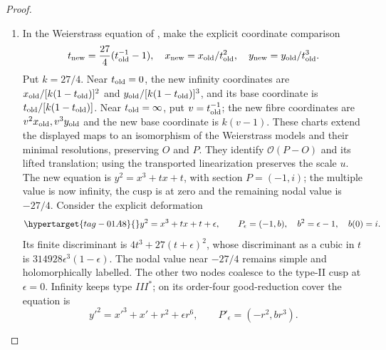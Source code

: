 \begin{proof}

\begin{enumerate}[label=\arabic*.,leftmargin=*]
\item In the Weierstrass equation of \cite[Proposition~2.1]{LiuRollenske2026}, make the explicit
coordinate comparison
\[
 t_{\rm new}=\frac{27}{4}(t_{\rm old}^{-1}-1),\quad
 x_{\rm new}=x_{\rm old}/t_{\rm old}^2,\quad
 y_{\rm new}=y_{\rm old}/t_{\rm old}^3.
\]
Put $k=27/4$. Near $t_{\rm old}=0$, the new infinity coordinates are
$x_{\rm old}/[k(1-t_{\rm old})]^2$ and
$y_{\rm old}/[k(1-t_{\rm old})]^3$, and its base coordinate is
$t_{\rm old}/[k(1-t_{\rm old})]$. Near $t_{\rm old}=\infty$, put
$v=t_{\rm old}^{-1}$; the new fibre coordinates are
$v^2x_{\rm old},v^3y_{\rm old}$ and the new base coordinate is $k(v-1)$.
These charts extend the displayed maps to an isomorphism of the
Weierstrass models and their minimal resolutions, preserving $O$ and $P$.
They identify $\mathcal O(P-O)$ and its lifted translation; using the
transported linearization preserves the scale $u$.
The new equation is $y^2=x^3+tx+t$, with section $P=(-1,i)$; the multiple
value is now infinity, the cusp is at zero and the remaining nodal
value is $-27/4$. Consider the explicit deformation
\begin{equation}\hypertarget{tag-01A8}{}\label{cdp:eq:E14-elliptic-family}
 y^2=x^3+tx+t+\epsilon,\qquad
 P_\epsilon=(-1,b),\quad b^2=\epsilon-1,
 \quad b(0)=i.
\end{equation}
Its finite discriminant is $4t^3+27(t+\epsilon)^2$, whose discriminant
as a cubic in $t$ is $314928\epsilon^3(1-\epsilon)$.
The nodal value near $-27/4$ remains simple and holomorphically
labelled. The other two nodes coalesce to the type-II cusp at
$\epsilon=0$. Infinity keeps type $III^*$; on its order-four
good-reduction cover the equation is
\[
 y'^2=x'^3+x'+r^2+\epsilon r^6,
 \qquad P'_{\epsilon}=(-r^2,br^3).
\]


\end{enumerate}
\end{proof}

